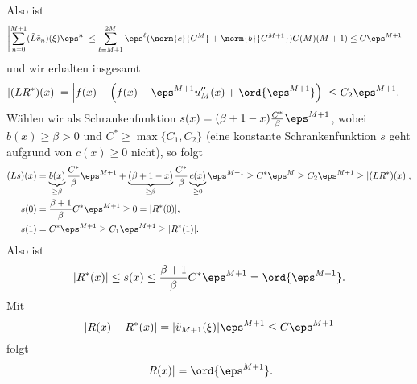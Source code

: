 \documentclass[12pt]{article}
\begin{document}
  Also ist
  \begin{align*}
      \left|\sum_{n=0}^{M+1}(\tilde L\tilde v_n)(\xi)\eps^n\right|
         &\leq  \sum_{\ell=M+1}^{2M}\eps^\ell (\norm{c}{C^M}+\norm{b}{C^{M+1}})C(M)(M+1)
          \leq C\eps^{M+1}
  \end{align*}
  und wir erhalten insgesamt
  \begin{align*}
      |(LR^*)(x)| &= \left|
                     f(x)
                     -\left( f(x)-\eps^{M+1}u_M''(x)
                            +\ord{\eps^{M+1}}
                      \right)
                   \right|\leq C_2\eps^{M+1}.
  \end{align*}
  Wählen wir als Schrankenfunktion $s(x)=(\beta+1-x)\frac{C^*}{\beta}\eps^{M+1}$, wobei $b(x)\geq\beta>0$ und $C^*\geq\max\{C_1,C_2\}$
  (eine konstante Schrankenfunktion $s$ geht aufgrund von $c(x)\geq 0$ nicht),
  so folgt
  \begin{align*}
      (Ls)(x) &= \underbrace{b(x)}_{\geq\beta}\frac{C^*}{\beta}\eps^{M+1}+\underbrace{(\beta+1-x)}_{\geq\beta}\frac{C^*}{\beta}\underbrace{c(x)}_{\geq 0}\eps^{M+1}
               \geq C^*\eps^M
               \geq C_2\eps^{M+1}
               \geq |(LR^*)(x)|,\\
         s(0) &= \frac{\beta+1}{\beta}C^*\eps^{M+1}
               \geq 0=|R^*(0)|,\\
         s(1) &= C^*\eps^{M+1}
               \geq C_1\eps^{M+1}
               \geq |R^*(1)|.
  \end{align*}
  Also ist
  \[
      |R^*(x)|\leq s(x)\leq \frac{\beta+1}{\beta}C^*\eps^{M+1}=\ord{\eps^{M+1}}.
  \]
  Mit 
  \[
      |R(x)-R^*(x)|=|\tilde v_{M+1}(\xi)|\eps^{M+1}\leq C\eps^{M+1}
  \]
  folgt
  \[    
      |R(x)|=\ord{\eps^{M+1}}.
  \]
\end{document}
